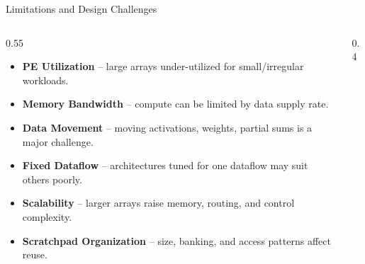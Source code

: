 \documentclass[aspectratio=169,10pt]{beamer}
\begin{document}
\begin{frame}{Limitations and Design Challenges}
  \begin{columns}[T]
    \begin{column}{0.55\textwidth}
      \begin{itemize}
        \item \textbf{PE Utilization} -- large arrays under-utilized for small/irregular workloads.
        \item \textbf{Memory Bandwidth} -- compute can be limited by data supply rate.
        \item \textbf{Data Movement} -- moving activations, weights, partial sums is a major challenge.
        \item \textbf{Fixed Dataflow} -- architectures tuned for one dataflow may suit others poorly.
        \item \textbf{Scalability} -- larger arrays raise memory, routing, and control complexity.
        \item \textbf{Scratchpad Organization} -- size, banking, and access patterns affect reuse.
      \end{itemize}
    \end{column}
    \begin{column}{0.4\textwidth}
      \centering
    \end{column}
  \end{columns}
\end{frame}
\end{document}
